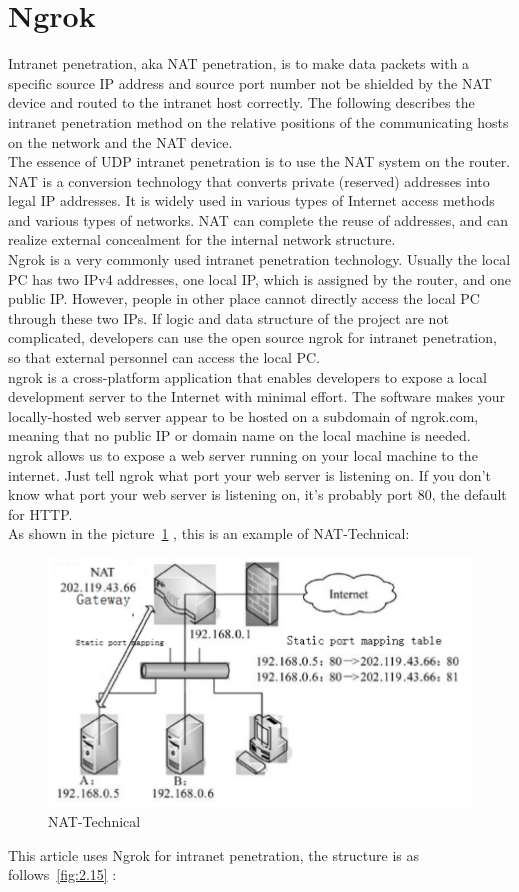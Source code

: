 \section{Ngrok}
\label{sec:Ngrok}
Intranet penetration, aka NAT penetration, is to make data packets with a specific source IP address and source port number not be shielded by the NAT device and routed to the intranet host correctly. The following describes the intranet penetration method on the relative positions of the communicating hosts on the network and the NAT device.
\\
The essence of UDP intranet penetration is to use the NAT system on the router. NAT is a conversion technology that converts private (reserved) addresses into legal IP addresses. It is widely used in various types of Internet access methods and various types of networks. NAT can complete the reuse of addresses, and can realize external concealment for the internal network structure.\\
Ngrok is a very commonly used intranet penetration technology. Usually the local PC has two IPv4 addresses, one local IP, which is assigned by the router, and one public IP. However, people in other place cannot directly access the local PC through these two IPs. If logic and data structure of the project are not complicated, developers can use the open source ngrok for intranet penetration, so that external personnel can access the local PC.\\
ngrok is a cross-platform application that enables developers to expose a local development server to the Internet with minimal effort. The software makes your locally-hosted web server appear to be hosted on a subdomain of ngrok.com, meaning that no public IP or domain name on the local machine is needed.\\
ngrok allows us to expose a web server running on your local machine to the internet. Just tell ngrok what port your web server is listening on. If you don't know what port your web server is listening on, it's probably port 80, the default for HTTP.\\
As shown in the picture~\ref{fig:2.14} , this is an example of NAT-Technical:
\begin{figure}[!ht]
	\centering
	\includegraphics[width=13cm]{grafiken/2.14.pdf}
	\caption{NAT-Technical} 
	\label{fig:2.14}
\end{figure}
\FloatBarrier
This article uses Ngrok for intranet penetration, the structure is as follows~\ref{fig:2.15} :

